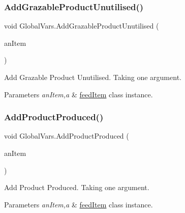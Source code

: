 \subsubsection{\texorpdfstring{AddGrazableProductUnutilised()}{AddGrazableProductUnutilised()}}
{\footnotesize\ttfamily void Global\+Vars.\+Add\+Grazable\+Product\+Unutilised (\begin{DoxyParamCaption}\item[{\mbox{\hyperlink{classfeed_item}{feed\+Item}}}]{an\+Item }\end{DoxyParamCaption})\hspace{0.3cm}{\ttfamily [inline]}}



Add Grazable Product Unutilised. Taking one argument. 


\begin{DoxyParams}{Parameters}
{\em an\+Item,a} & \mbox{\hyperlink{classfeed_item}{feed\+Item}} class instance. \\
\hline
\end{DoxyParams}
\mbox{\label{class_global_vars_ab82efa871de33736324f919209f89c46}} 
\subsubsection{\texorpdfstring{AddProductProduced()}{AddProductProduced()}}
{\footnotesize\ttfamily void Global\+Vars.\+Add\+Product\+Produced (\begin{DoxyParamCaption}\item[{\mbox{\hyperlink{classfeed_item}{feed\+Item}}}]{an\+Item }\end{DoxyParamCaption})\hspace{0.3cm}{\ttfamily [inline]}}



Add Product Produced. Taking one argument. 


\begin{DoxyParams}{Parameters}
{\em an\+Item,a} & \mbox{\hyperlink{classfeed_item}{feed\+Item}} class instance. \\
\hline
\end{DoxyParams}
\mbox{\label{class_global_vars_a5659ed6651b76f2d25cc6900309c2a37}} 
